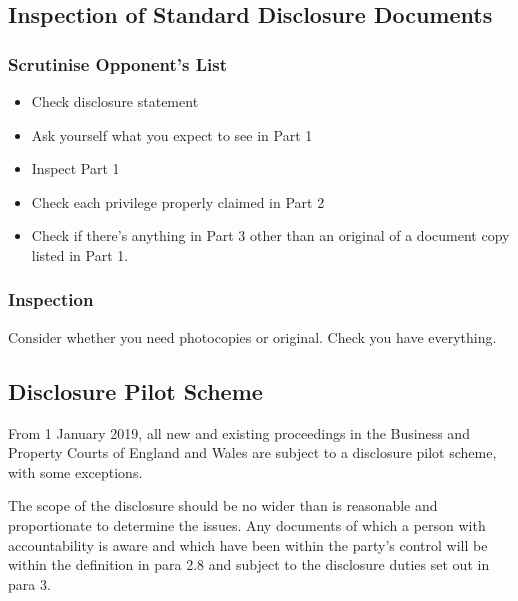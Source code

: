 \documentclass[
]{article}
\providecommand{\tightlist}{%
  \setlength{\itemsep}{0pt}\setlength{\parskip}{0pt}}
\begin{document}
\hypertarget{inspection-of-standard-disclosure-documents}{%
\subsection{Inspection of Standard Disclosure
Documents}\label{inspection-of-standard-disclosure-documents}}

\hypertarget{scrutinise-opponents-list}{%
\subsubsection{Scrutinise Opponent's
List}\label{scrutinise-opponents-list}}

\begin{itemize}
\tightlist
\item
  Check disclosure statement
\item
  Ask yourself what you expect to see in Part 1
\item
  Inspect Part 1
\item
  Check each privilege properly claimed in Part 2
\item
  Check if there's anything in Part 3 other than an original of a
  document copy listed in Part 1.
\end{itemize}

\hypertarget{inspection}{%
\subsubsection{Inspection}\label{inspection}}

Consider whether you need photocopies or original. Check you have
everything.

\hypertarget{disclosure-pilot-scheme}{%
\subsection{Disclosure Pilot Scheme}\label{disclosure-pilot-scheme}}

From 1 January 2019, all new and existing proceedings in the Business
and Property Courts of England and Wales are subject to a disclosure
pilot scheme, with some exceptions.

The scope of the disclosure should be no wider than is reasonable and
proportionate to determine the issues. Any documents of which a person
with accountability is aware and which have been within the party's
control will be within the definition in para 2.8 and subject to the
disclosure duties set out in para 3.
\end{document}
